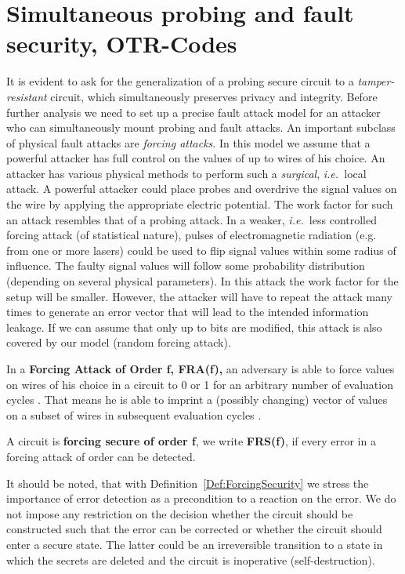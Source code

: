 \documentclass[11pt]{llncs}
\newcommand{\BDEF}{\begin{definition}}  \newcommand{\EDEF}{\end{definition}}
\newcommand{\ie}{{\it i.e.\ }}
\begin{document}
\section{Simultaneous probing and fault security, OTR-Codes}\label{Sec:OTR}
It is evident to ask for the generalization
of a probing secure circuit to a \emph{tamper-resistant} circuit, which
simultaneously preserves privacy and integrity.
Before further analysis we need to set up a precise fault attack model
for an attacker who can simultaneously mount probing and fault attacks.
An important subclass of physical fault attacks are \emph{forcing attacks}.
In this model we assume that a powerful attacker has full control
on the values of up to  wires of his choice.
An attacker has various physical methods to perform
such a \emph{surgical}, \ie local attack.
A powerful attacker could place  probes and overdrive the signal
values on the wire by applying the appropriate electric potential.
The work factor for such an attack resembles that of a probing attack.
In a weaker, \ie less controlled forcing attack (of statistical nature),
pulses of electromagnetic radiation (e.g. from one or more lasers)
could be used to flip signal values within some radius of influence.
The faulty signal
values will follow some probability distribution
(depending on several physical parameters).
In this attack the work factor for the setup will be smaller.
However, the attacker will have to repeat the attack many
times to generate an error vector that will lead to the intended
information leakage.
If we can assume that only up to  bits are modified,
this attack is also covered by our model (random forcing attack).
\BDEF
In a \textbf{Forcing Attack of Order f, FRA(f),} an adversary
is able to force values 
on  wires of his choice in a circuit to 0 or 1
for an arbitrary number of
evaluation cycles .
That means he is able to imprint a (possibly changing)
vector of values 
on a subset of  wires in subsequent evaluation cycles .
\EDEF
\BDEF
A circuit is \textbf{forcing secure of order f}, we write \textbf{FRS(f)},
if every error in a forcing attack of order  can be detected.
\label{Def:ForcingSecurity}
\EDEF
It should be noted, that with  Definition~\ref{Def:ForcingSecurity}
we stress the importance of error
detection as a precondition to a reaction on the error.
We do not impose any restriction on the decision
whether the circuit should be constructed such that
the error can be corrected or whether the circuit should enter
a secure state. The latter could be an irreversible transition to a state in
which the secrets are deleted and the circuit is inoperative (self-destruction).
\end{document}
